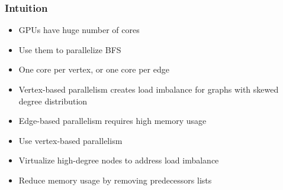 \begin{frame}
\end{frame}


\begin{frame}
  \frametitle{Intuition}

  \begin{itemize}
    \item GPUs have huge number of cores
    \item Use them to parallelize BFS
    \item One core per vertex, or one core per edge
    \item Vertex-based parallelism creates load imbalance for graphs with skewed degree distribution
    \item Edge-based parallelism requires high memory usage
  \end{itemize}
  \begin{itemize}
    \item Use vertex-based parallelism
    \item Virtualize high-degree nodes to address load imbalance
    \item Reduce memory usage by removing predecessors lists
  \end{itemize}

\end{frame}


